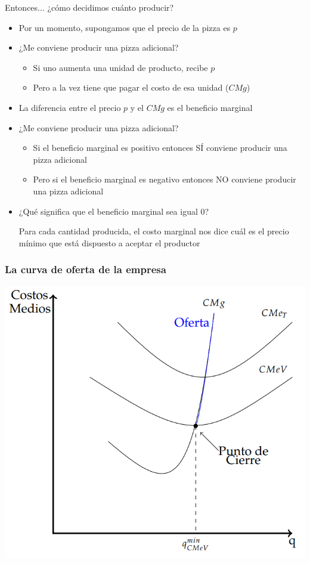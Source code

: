 \documentclass{beamer}
\begin{document}
\begin{frame}{Entonces... ¿cómo decidimos cuánto producir?}
    \begin{itemize}
        \item Por un momento, supongamos que el precio de la pizza es $p$
            \item ¿Me conviene producir una pizza adicional?  
        \begin{itemize}
            \item Si uno aumenta una unidad de producto, recibe $p$
            \item Pero a la vez tiene que pagar el costo de esa unidad ($CMg$)
        \end{itemize}
        \item La diferencia entre el precio $p$ y el $CMg$ es el beneficio marginal
        \item ¿Me conviene producir una pizza adicional?
        \begin{itemize}
            \item Si el beneficio marginal es positivo entonces SÍ conviene producir una pizza adicional
            \item Pero si el beneficio marginal es negativo entonces NO conviene producir una pizza adicional
        \end{itemize} 
        \item ¿Qué significa que el beneficio marginal sea igual 0?
        \begin{boxB}
            \centering
            Para cada cantidad producida, el costo marginal nos dice cuál es el precio mínimo que está dispuesto a aceptar el productor
        \end{boxB}
    \end{itemize}
\end{frame}

\begin{frame}
\frametitle{La curva de oferta de la empresa}
\centering
\includegraphics[scale=0.5]{../Figures/C13.11.png}
\end{frame}
\end{document}
